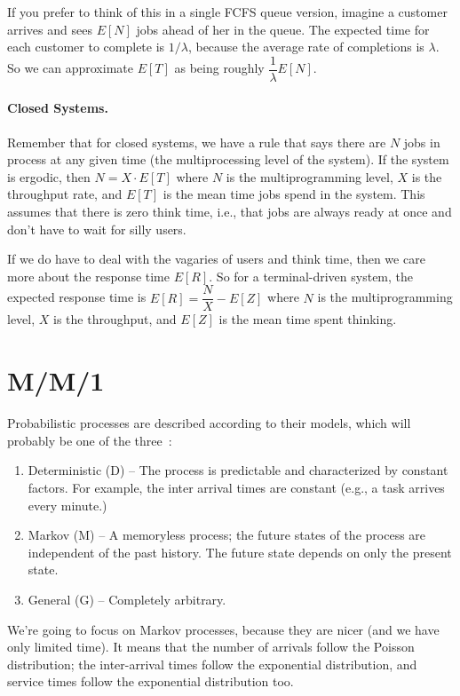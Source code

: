 \documentclass[a4paper]{report}
\begin{document}
If you prefer to think of this in a single FCFS queue version, imagine a customer arrives and sees $E[N]$ jobs ahead of her in the queue. The expected time for each customer to complete is $1/\lambda$, because the average rate of completions is $\lambda $. So we can approximate $E[T]$ as being roughly $\dfrac{1}{\lambda}E[N]$.

\paragraph{Closed Systems.} Remember that for closed systems, we have a rule that says there are $N$ jobs in process at any given time (the multiprocessing level of the system). If the system is ergodic, then $N = X \cdot E[T]$ where $N$ is the multiprogramming level, $X$ is the throughput rate, and $E[T]$ is the mean time jobs spend in the system. This assumes that there is zero think time, i.e., that jobs are always ready at once and don't have to wait for silly users.

If we do have to deal with the vagaries of users and think time, then we care more about the response time $E[R]$. So for a terminal-driven system, the expected response time is $E[R] = \dfrac{N}{X} - E[Z]$ where $N$ is the multiprogramming level, $X$ is the throughput, and $E[Z]$ is the mean time spent thinking. 

\section*{M/M/1}

Probabilistic processes are described according to their models, which will probably be one of the three~\cite{swps}:

\begin{enumerate}
	\item Deterministic (D) -- The process is predictable and characterized by constant factors. For example, the inter arrival times are constant (e.g., a task arrives every minute.)
	\item Markov (M) -- A memoryless process; the future states of the process are independent of the past history. The future state depends on only the present state.
	\item General (G) -- Completely arbitrary.
\end{enumerate}

We're going to focus on Markov processes, because they are nicer (and we have only limited time). It means that the number of arrivals follow the Poisson distribution; the inter-arrival times follow the exponential distribution, and service times follow the exponential distribution too. 
\end{document}
